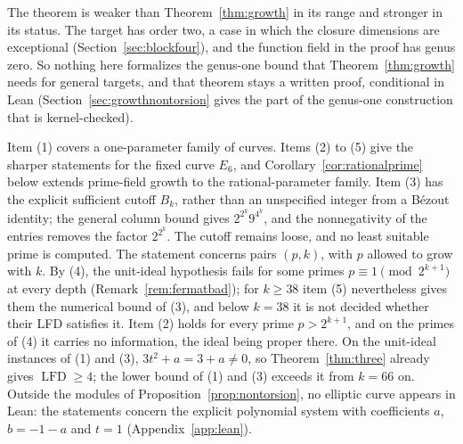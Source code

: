 \documentclass[11pt]{article}
\theoremstyle{definition}\newtheorem{definition}[theorem]{Definition}
\theoremstyle{remark}\newtheorem{remark}[theorem]{Remark}
\newcommand{\lfd}{\operatorname{LFD}}
\begin{document}
The theorem is weaker than Theorem~\ref{thm:growth} in its range and
stronger in its status. The target has order two, a case in which the
closure dimensions are exceptional (Section~\ref{sec:blockfour}), and the
function field in the proof has genus zero. So nothing here formalizes the
genus-one bound that Theorem~\ref{thm:growth} needs for general targets,
and that theorem stays a written proof, conditional in Lean
(Section~\ref{sec:growthnontorsion} gives the part of the genus-one
construction that is kernel-checked).

Item (1) covers a one-parameter family of curves. Items (2) to (5) give the
sharper statements for the fixed curve $E_6$, and
Corollary~\ref{cor:rationalprime} below extends prime-field growth to the
rational-parameter family. Item (3) has the explicit sufficient cutoff
$B_k$, rather than an unspecified integer from a B\'ezout identity; the
general column bound gives $2^{2^k}9^{4^k}$, and the nonnegativity of the
entries removes the factor $2^{2^k}$. The cutoff remains loose, and no least
suitable prime is computed. The statement concerns pairs $(p,k)$, with $p$
allowed to grow with $k$. By (4), the unit-ideal hypothesis fails for some
primes $p\equiv1\pmod{2^{k+1}}$ at every depth
(Remark~\ref{rem:fermatbad}); for $k\ge38$ item (5) nevertheless gives them
the numerical bound of (3), and below $k=38$ it is not decided whether their
LFD satisfies it. Item (2) holds for every prime $p>2^{k+1}$, and on the
primes of (4) it carries no information, the ideal being proper there. On
the unit-ideal instances of (1) and (3), $3t^2+a=3+a\ne0$, so
Theorem~\ref{thm:three} already gives $\lfd\ge4$; the lower bound of (1)
and (3) exceeds it from $k=66$ on. Outside the modules of
Proposition~\ref{prop:nontorsion}, no elliptic curve appears in Lean: the
statements concern the explicit polynomial system with coefficients $a$,
$b=-1-a$ and $t=1$ (Appendix~\ref{app:lean}).
\end{document}
